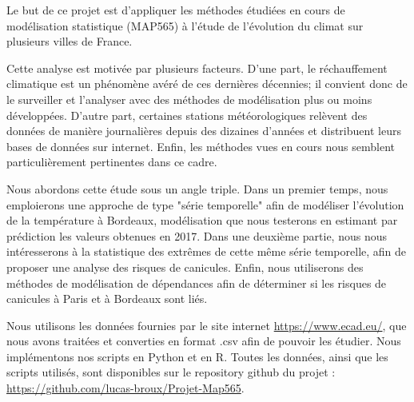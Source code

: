\documentclass[../report.tex]{subfiles}
\begin{document}
\par Le but de ce projet est d'appliquer les méthodes étudiées en cours de modélisation statistique (MAP565) à l'étude de l'évolution du climat sur plusieurs villes de France.

\par Cette analyse est motivée par plusieurs facteurs. D'une part, le réchauffement climatique est un phénomène avéré de ces dernières décennies; il convient donc de le surveiller et l'analyser avec des méthodes de modélisation plus ou moins développées. D'autre part, certaines stations météorologiques relèvent des données de manière journalières depuis des dizaines d'années et distribuent leurs bases de données sur internet. Enfin, les méthodes vues en cours nous semblent particulièrement pertinentes dans ce cadre.

\par Nous abordons cette étude sous un angle triple.
Dans un premier temps, nous emploierons une approche de type "série temporelle" afin de modéliser l'évolution de la température à Bordeaux, modélisation que nous testerons en estimant par prédiction les valeurs obtenues en 2017.
Dans une deuxième partie, nous nous intéresserons à la statistique des extrêmes de cette même série temporelle, afin de proposer une analyse des risques de canicules.
Enfin, nous utiliserons des méthodes de modélisation de dépendances afin de déterminer si les risques de canicules à Paris et à Bordeaux sont liés.

\par Nous utilisons les données fournies par le site internet \url{https://www.ecad.eu/}, que nous avons traitées et converties en format .csv afin de pouvoir les étudier. 
Nous implémentons nos scripts en Python et en R.
Toutes les données, ainsi que les scripts utilisés, sont disponibles sur le repository github du projet : \url{https://github.com/lucas-broux/Projet-Map565}.
\end{document}
